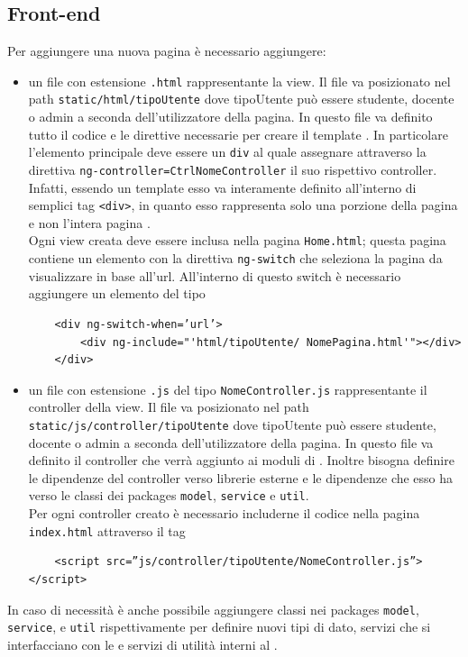 \documentclass[12pt,a4paper]{article}
\begin{document}
	\subsection{Front-end}
	Per aggiungere una nuova pagina è necessario aggiungere:
	\begin{itemize}
	\item un file con estensione \texttt{.html} rappresentante la view. Il file va posizionato nel path \texttt{static/html/tipoUtente} dove tipoUtente può essere studente, docente o admin a seconda dell’utilizzatore della pagina. In questo file va definito tutto il codice  e le direttive  necessarie per creare il template . In particolare l’elemento principale deve essere un \texttt{div} al quale assegnare attraverso la direttiva  \texttt{ng-controller=CtrlNomeController} il suo rispettivo controller. Infatti, essendo un template  esso va interamente definito all'interno di semplici tag \texttt{<div>}, in quanto esso rappresenta solo una porzione della pagina e non l'intera pagina .\\
	Ogni view creata deve essere inclusa nella pagina \texttt{Home.html}; questa pagina contiene un elemento con la direttiva \texttt{ng-switch} che seleziona la pagina da visualizzare in base all’url. All’interno di questo switch è necessario aggiungere un elemento del tipo 
	\begin{verbatim}
	<div ng-switch-when=’url’>
		<div ng-include="'html/tipoUtente/ NomePagina.html'"></div>
	</div>
	\end{verbatim}
	\item un file con estensione \texttt{.js} del tipo \texttt{NomeController.js} rappresentante il controller della view. Il file va posizionato nel path \texttt{static/js/controller/tipoUtente} dove tipoUtente può essere studente, docente o admin a seconda dell’utilizzatore della pagina. In questo file va definito il controller che verrà aggiunto ai moduli di . Inoltre bisogna definire le dipendenze del controller verso librerie esterne e le dipendenze che esso ha verso le classi dei packages \texttt{model}, \texttt{service} e \texttt{util}.\\
	Per ogni controller creato è necessario includerne il codice nella pagina \texttt{index.html} attraverso il tag 
	\begin{verbatim}
	<script src=”js/controller/tipoUtente/NomeController.js”></script>
	\end{verbatim}

	\end{itemize}
	In caso di necessità è anche possibile aggiungere classi nei packages \texttt{model}, \texttt{service}, e \texttt{util} rispettivamente per definire nuovi tipi di dato, servizi che si interfacciano con le  e servizi di utilità interni al .
\end{document}
